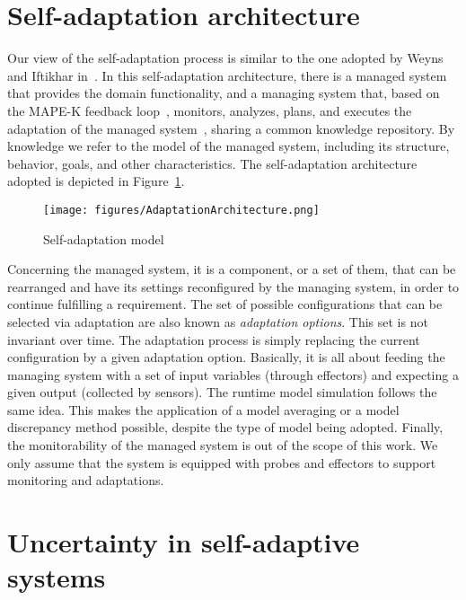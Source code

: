 \section{Self-adaptation architecture} \label{sec:sasarch}

Our view of the self-adaptation process is similar to the one adopted by Weyns and Iftikhar in~\cite{weyns2016model}. In this self-adaptation architecture, there is a managed system that provides the domain functionality, and a managing system that, based on the MAPE-K feedback loop~\cite{kephart2003vision}, monitors, analyzes, plans, and executes the adaptation of the managed system~\cite{garlan2004rainbow}, sharing a common knowledge repository. By knowledge we refer to the model of the managed system, including its structure, behavior, goals, and other characteristics. The self-adaptation architecture adopted is depicted in Figure~\ref{fig:adapt}.

\begin{figure}[!h]
	\centering
	\texttt{[image: figures/AdaptationArchitecture.png]}
	\caption{Self-adaptation model~\cite{weyns2016model}}
	\label{fig:adapt}
\end{figure}

Concerning the managed system, it is a component, or a set of them, that can be rearranged and have its settings reconfigured by the managing system, in order to continue fulfilling a requirement. The set of possible configurations that can be selected via adaptation are also known as \textit{adaptation options}. This set is not invariant over time. The adaptation process is simply replacing the current configuration by a given adaptation option. Basically, it is all about feeding the managing system with a set of input variables (through effectors) and expecting a given output (collected by sensors). The runtime model simulation follows the same idea. This makes the application of a model averaging or a model discrepancy method possible, despite the type of model being adopted. Finally, the monitorability of the managed system is out of the scope of this work. We only assume
that the system is equipped with probes and
effectors to support monitoring and adaptations.

\section{Uncertainty in self-adaptive systems}

